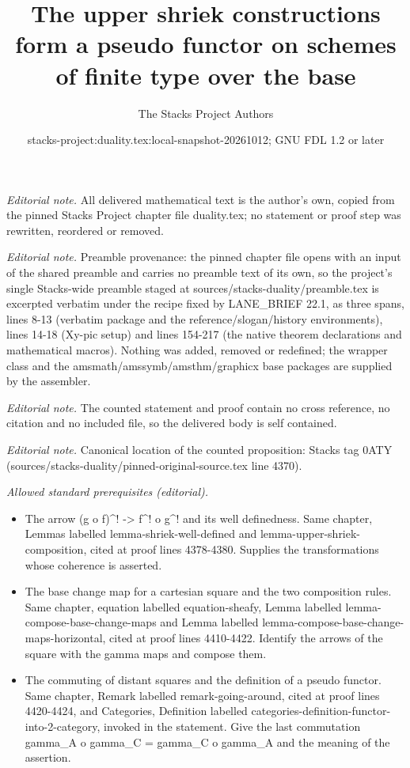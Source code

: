 \documentclass[10pt,a4paper]{amsart}
\title{The upper shriek constructions form a pseudo functor on schemes of finite type over the base}
\author{The Stacks Project Authors}
\date{stacks-project:duality.tex:local-snapshot-20261012; GNU FDL 1.2 or later}
\theoremstyle{plain}
\theoremstyle{definition}
\theoremstyle{remark}
\numberwithin{equation}{subsection}
\begin{document}
\maketitle
\noindent\textit{Editorial note.} All delivered mathematical text is the author's own, copied from the pinned Stacks Project chapter file duality.tex; no statement or proof step was rewritten, reordered or removed.\par\medskip
\noindent\textit{Editorial note.} Preamble provenance: the pinned chapter file opens with an input of the shared preamble and carries no preamble text of its own, so the project's single Stacks-wide preamble staged at sources/stacks-duality/preamble.tex is excerpted verbatim under the recipe fixed by LANE\_BRIEF 22.1, as three spans, lines 8-13 (verbatim package and the reference/slogan/history environments), lines 14-18 (Xy-pic setup) and lines 154-217 (the native theorem declarations and mathematical macros). Nothing was added, removed or redefined; the wrapper class and the amsmath/amssymb/amsthm/graphicx base packages are supplied by the assembler.\par\medskip
\noindent\textit{Editorial note.} The counted statement and proof contain no cross reference, no citation and no included file, so the delivered body is self contained.\par\medskip
\noindent\textit{Editorial note.} Canonical location of the counted proposition: Stacks tag 0ATY (sources/stacks-duality/pinned-original-source.tex line 4370).\par\medskip
\noindent\textit{Allowed standard prerequisites (editorial).}\begin{itemize}
\item The arrow (g o f)\textasciicircum{}! -> f\textasciicircum{}! o g\textasciicircum{}! and its well definedness. Same chapter, Lemmas labelled lemma-shriek-well-defined and lemma-upper-shriek-composition, cited at proof lines 4378-4380. Supplies the transformations whose coherence is asserted.
\item The base change map for a cartesian square and the two composition rules. Same chapter, equation labelled equation-sheafy, Lemma labelled lemma-compose-base-change-maps and Lemma labelled lemma-compose-base-change-maps-horizontal, cited at proof lines 4410-4422. Identify the arrows of the square with the gamma maps and compose them.
\item The commuting of distant squares and the definition of a pseudo functor. Same chapter, Remark labelled remark-going-around, cited at proof lines 4420-4424, and Categories, Definition labelled categories-definition-functor-into-2-category, invoked in the statement. Give the last commutation gamma\_A o gamma\_C = gamma\_C o gamma\_A and the meaning of the assertion.
\end{itemize}\medskip
\end{document}
